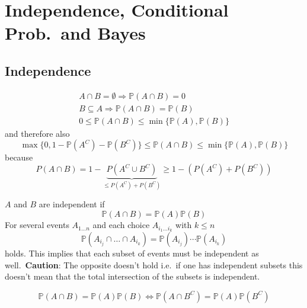 \section{Independence, Conditional Prob.\ and Bayes}
\subsection{Independence}

\noindent\begin{gather*}
    A \cap B = \emptyset \Rightarrow \mathbb{P}(A\cap B) = 0 \\
    B \subseteq A \Rightarrow \mathbb{P}(A\cap B) = \mathbb{P}(B) \\
    0 \leq \mathbb{P}(A\cap B) \leq \min\{\mathbb{P}(A), \mathbb{P}(B)\}
\end{gather*}
and therefore also
\begin{equation*}
    \max\{0, 1-\mathbb{P}(A^C) -\mathbb{P}(B^C)\} \leq \mathbb{P}(A\cap B) \leq \min\{ \mathbb{P}(A), \mathbb{P}(B)\}
\end{equation*}
because
\begin{equation*}
    P(A\cap B)=1-\underbrace{P(A^C \cup B^C)}_{\le P(A^C)+P(B^C)}\ge 1-(P(A^C)+P(B^C))
\end{equation*}


$A$ and $B$ are independent if
\noindent\begin{equation*}
    \mathbb{P}(A\cap B) = \mathbb{P}(A)\mathbb{P}(B)
\end{equation*}
For several events $A_{1\dots n}$ and each choice $A_{i_1\dots i_k}$ with $k\leq n$
\noindent\begin{equation*}
    \mathbb{P}(A_{i_j} \cap \dots \cap A_{i_k}) = \mathbb{P}(A_{i_j}) \cdots \mathbb{P}(A_{i_k})
\end{equation*}
holds. This implies that each subset of events must be independent as well.\ \textbf{Caution}: The opposite doesn't hold i.e.\ if one has independent subsets this doesn't mean that the total intersection of the subsets is independent.


\noindent\begin{equation*}
    \mathbb{P}(A\cap B) = \mathbb{P}(A)\mathbb{P}(B) \Leftrightarrow \mathbb{P}(A\cap B^C) = \mathbb{P}(A)\mathbb{P}(B^C)
\end{equation*}

